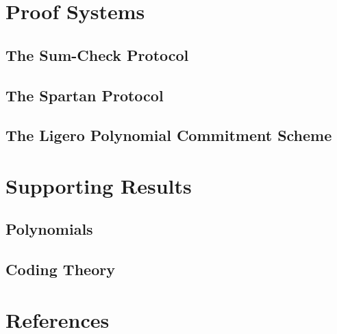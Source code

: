 \chapter{Proof Systems}

\section{The Sum-Check Protocol}

\section{The Spartan Protocol}

\section{The Ligero Polynomial Commitment Scheme}


\chapter{Supporting Results}

\section{Polynomials}

\section{Coding Theory}


\chapter{References}

